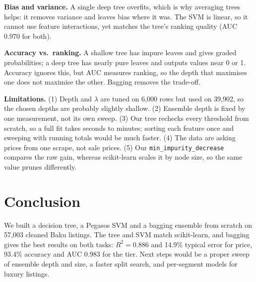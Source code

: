 \textbf{Bias and variance.} A single deep tree overfits, which is why averaging trees helps: it removes variance and leaves bias where it was. The SVM is linear, so it cannot use feature interactions, yet matches the tree's ranking quality (AUC 0.970 for both).

\textbf{Accuracy vs.\ ranking.} A shallow tree has impure leaves and gives graded probabilities; a deep tree has nearly pure leaves and outputs values near 0 or 1. Accuracy ignores this, but AUC measures ranking, so the depth that maximises one does not maximise the other. Bagging removes the trade-off.

\textbf{Limitations.} (1) Depth and $\lambda$ are tuned on 6{,}000 rows but used on 39{,}902, so the chosen depths are probably slightly shallow. (2) Ensemble depth is fixed by one measurement, not its own sweep. (3) Our tree rechecks every threshold from scratch, so a full fit takes seconds to minutes; sorting each feature once and sweeping with running totals would be much faster. (4) The data are asking prices from one scrape, not sale prices. (5) Our \texttt{min\_impurity\_decrease} compares the raw gain, whereas scikit-learn scales it by node size, so the same value prunes differently.

\section{Conclusion}
We built a decision tree, a Pegasos SVM and a bagging ensemble from scratch on 57{,}003 cleaned Baku listings. The tree and SVM match scikit-learn, and bagging gives the best results on both tasks: $R^2=0.886$ and 14.9\% typical error for price, 93.4\% accuracy and AUC 0.983 for the tier. Next steps would be a proper sweep of ensemble depth and size, a faster split search, and per-segment models for luxury listings.
